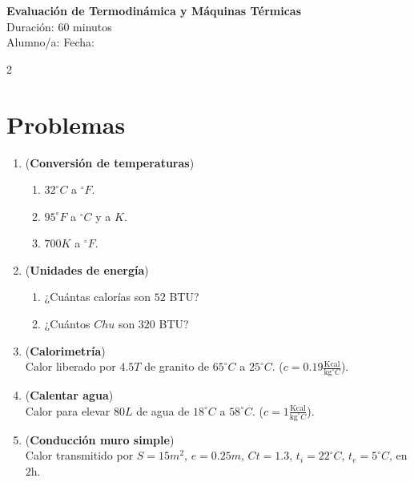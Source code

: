 \documentclass[a4paper,12pt]{article}
\begin{document}
\begin{center}
    \Large \textbf{Evaluación de Termodinámica y Máquinas Térmicas} \\
    \normalsize Duración: 60 minutos \\
    Alumno/a: \underline{\hspace{6cm}} \hspace{0.5cm} Fecha: \underline{\hspace{2cm}}
\end{center}

\vspace{0.3cm}

\begin{multicols}{2}

\section*{Problemas}

\begin{enumerate}
\item (\textbf{Conversión de temperaturas})
\begin{enumerate}
    \item $32^\circ C$ a $^\circ F$.
    \item $95^\circ F$ a $^\circ C$ y a $K$.
    \item $700K$ a $^\circ F$.
\end{enumerate}

\item (\textbf{Unidades de energía})
\begin{enumerate}
    \item ¿Cuántas calorías son $52$ BTU?
    \item ¿Cuántos $Chu$ son $320$ BTU?
\end{enumerate}

\item (\textbf{Calorimetría})\\
Calor liberado por $4.5T$ de granito de $65^\circ C$ a $25^\circ C$. ($c=0.19\frac{\text{Kcal}}{\text{kg}^\circ C}$).

\item (\textbf{Calentar agua})\\
Calor para elevar $80L$ de agua de $18^\circ C$ a $58^\circ C$. ($c=1\frac{\text{Kcal}}{\text{kg}^\circ C}$).

\item (\textbf{Conducción muro simple})\\
Calor transmitido por $S=15m^2$, $e=0.25m$, $Ct=1.3$, $t_i=22^\circ C$, $t_e=5^\circ C$, en $2$h.


\end{enumerate}
\end{multicols}
\end{document}
